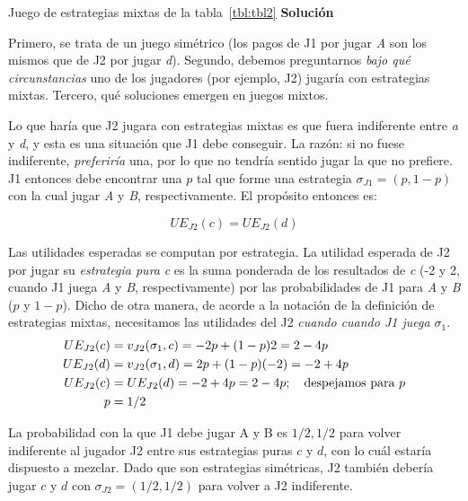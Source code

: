\documentclass[12pt]{scrartcl}
\begin{document}
\begin{exbox}{Juego de estrategias mixtas de la tabla~\ref{tbl:tbl2}}
	\textbf{Solución}
	    
	Primero, se trata de un juego simétrico (los pagos de J1 por jugar \textit{A} son los mismos que de J2 por jugar \textit{d}). Segundo, debemos preguntarnos\textit{ bajo qué circunstancias} uno de los jugadores (por ejemplo, J2) jugaría con estrategias mixtas. Tercero, qué soluciones emergen en juegos mixtos.
	    
	Lo que haría que J2 jugara con estrategias mixtas es que fuera indiferente entre \textit{a} y \textit{d}, y esta es una situación que J1 debe conseguir. La razón: si no fuese indiferente, \textit{preferiría} una, por lo que no tendría sentido jugar la que no prefiere. J1 entonces debe encontrar una $p$ tal que forme una estrategia $\sigma_{J1} = (p, 1-p)$ con la cual jugar \textit{A} y \textit{B}, respectivamente. El propósito entonces es:
	    
	\[ UE_{J2}(c) = UE_{J2}(d) \]
	    
	Las utilidades esperadas se computan por estrategia. La utilidad esperada de J2 por jugar su \textit{estrategia pura} \textit{c} es la suma ponderada de los resultados de \textit{c} (-2 y 2, cuando J1 juega \textit{A} y \textit{B}, respectivamente) por las probabilidades de J1 para \textit{A} y \textit{B} ($p$ y $1-p$). Dicho de otra manera, de acorde a la notación de la definición de estrategias mixtas, necesitamos las utilidades del J2 \textit{cuando cuando J1 juega $\sigma_1$}.
	\begin{align*}
		\vspace{-1cm}
		UE_{J2}(c) & = v_{J2}(\sigma_1, c) = -2p + (1-p)2    = 2 -4p                \\
		UE_{J2}(d) & = v_{J2}(\sigma_1, d) =  2p  + (1-p)(-2) = -2 + 4p             \\
		UE_{J2}(c) & = UE_{J2}(d) = -2 + 4p = 2 -4p;\quad \text{despejamos para } p \\
		p          & = 1/2                                                          
	\end{align*}
	    
	La probabilidad con la que J1 debe jugar A y B es $1/2, 1/2$ para volver indiferente al jugador J2 entre sus estrategias puras $c$ y $d$, con lo cuál estaría dispuesto a mezclar. Dado que son estrategias simétricas, J2 también debería jugar $c$ y $d$ con $\sigma_{J2}=(1/2, 1/2)$ para volver a J2 indiferente. 
\end{exbox}
\end{document}

